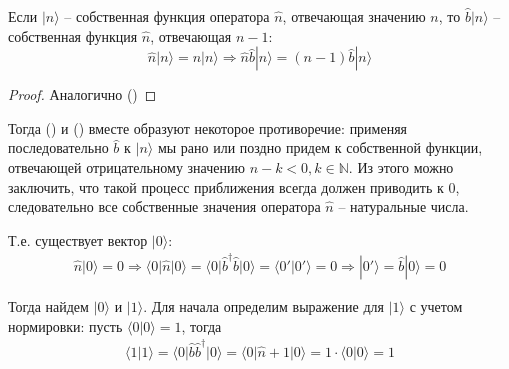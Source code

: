 \begin{theorem}
Если $|n\rangle$ -- собственная функция оператора $\hat{n}$, отвечающая значению $n$, то $\hat{b}|n\rangle$ -- собственная функция $\hat{n}$, отвечающая $n-1$:
$$
\hat{n}|n\rangle=n|n\rangle\Longrightarrow\hat{n}\hat{b}|n\rangle=(n-1)\hat{b}|n\rangle
$$
\end{theorem}
\begin{proof}
Аналогично ()
\end{proof}
Тогда () и () вместе образуют некоторое противоречие: применяя последовательно $\hat{b}$ к $|n\rangle$ мы рано или поздно придем к собственной функции, отвечающей отрицательному значению $n-k<0,k\in\mathbb{N}$. Из этого можно заключить, что такой процесс приближения всегда должен приводить к $0$, следовательно все собственные значения оператора $\hat{n}$ -- натуральные числа.

Т.е. существует вектор $|0\rangle$:
\begin{gather*}
\hat{n}|0\rangle = 0
\Longrightarrow
\langle 0|\hat{n}|0\rangle = \langle 0|\hat{b}^\dagger\hat{b}|0\rangle = \langle 0'|0'\rangle = 0
\Longrightarrow
|0'\rangle = \hat{b}|0\rangle = 0
\end{gather*}

Тогда найдем $|0\rangle$ и $|1\rangle$. Для начала определим выражение для $|1\rangle$ с учетом нормировки: пусть $\langle 0|0\rangle=1$, тогда
\begin{gather*}
\langle 1|1\rangle = \langle 0|\hat{b}\hat{b}^\dagger|0\rangle = \langle 0|\hat{n}+1|0\rangle =1\cdot\langle 0| 0\rangle = 1
\end{gather*}

